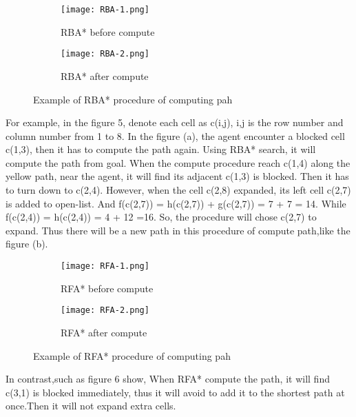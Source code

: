 \begin{figure}
  \centering
  \begin{subfigure}[b]{0.45\textwidth}
    \texttt{[image: RBA-1.png]}
    \caption{RBA* before compute}
  \end{subfigure}
  \begin{subfigure}[b]{0.45\textwidth}
    \texttt{[image: RBA-2.png]}
    \caption{RBA*  after compute}
  \end{subfigure}
  \caption{Example of RBA* procedure of computing pah}
  \label{fig:RBA*}
\end{figure}

For example, in the figure 5, denote each cell as c(i,j), i,j is the row number and column number from 1 to 8. In the figure (a), the agent encounter a blocked cell c(1,3), then it has to compute the path again. Using RBA* search, it will compute the path from goal. When the compute procedure reach c(1,4) along the yellow path,  near the agent, it will find its adjacent c(1,3) is blocked. Then it has to turn down to c(2,4). However, when the cell c(2,8) expanded, its left cell c(2,7) is added to open-list. And f(c(2,7)) = h(c(2,7)) + g(c(2,7)) = 7 + 7 = 14. While f(c(2,4)) = h(c(2,4)) = 4 + 12 =16. So, the procedure will chose c(2,7) to expand. Thus there will be a new path in this procedure of compute path,like the figure (b).\\

\begin{figure}
  \centering
  \begin{subfigure}[b]{0.45\textwidth}
    \texttt{[image: RFA-1.png]}
    \caption{RFA* before compute}
  \end{subfigure}
  \begin{subfigure}[b]{0.45\textwidth}
    \texttt{[image: RFA-2.png]}
    \caption{RFA*  after compute}
  \end{subfigure}
  \caption{Example of RFA* procedure of computing pah}
  \label{fig:RFA*}
\end{figure}

In contrast,such as figure 6 show, When RFA* compute the path, it will find c(3,1) is blocked immediately, thus it will avoid to add it to the shortest path at once.Then it will not expand extra cells.\\


